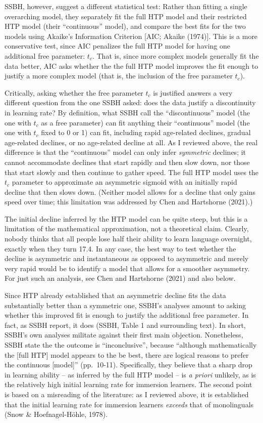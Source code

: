 \documentclass[
  english,
  doc,floatsintext]{apa6}
\begin{document}
SSBH, however, suggest a different statistical test: Rather than fitting a single overarching model, they separately fit the full HTP model and their restricted HTP model (their ``continuous'' model), and compare the best fits for the two models using Akaike's Information Criterion {[}AIC; Akaike (1974){]}. This is a more conservative test, since AIC penalizes the full HTP model for having one additional free parameter: \(t_c\). That is, since more complex models generally fit the data better, AIC asks whether the the full HTP model improves the fit enough to justify a more complex model (that is, the inclusion of the free parameter \(t_c\)).

Critically, asking whether the free parameter \(t_c\) is justified answers a very different question from the one SSBH asked: does the data justify a discontinuity in learning rate? By definition, what SSBH call the ``discontinuous'' model (the one with \(t_c\) as a free parameter) can fit anything their ``continuous'' model (the one with \(t_c\) fixed to 0 or 1) can fit, including rapid age-related declines, gradual age-related declines, or no age-related decline at all. As I reviewed above, the real difference is that the ``continuous'' model can only infer \emph{symmetric} declines; it cannot accommodate declines that start rapidly and then slow down, nor those that start slowly and then continue to gather speed. The full HTP model uses the \(t_c\) parameter to approximate an asymmetric sigmoid with an initially rapid decline that then slows down. (Neither model allows for a decline that only gains speed over time; this limitation was addressed by Chen and Hartshorne (2021).)

The initial decline inferred by the HTP model can be quite steep, but this is a limitation of the mathematical approximation, not a theoretical claim. Clearly, nobody thinks that all people lose half their ability to learn language overnight, exactly when they turn 17.4. In any case, the best way to test whether the decline is asymmetric and instantaneous as opposed to asymmetric and merely very rapid would be to identify a model that allows for a smoother asymmetry. For just such an analysis, see Chen and Hartshorne (2021) and also below.

Since HTP already established that an asymmetric decline fits the data substantially better than a symmetric one, SSBH's analyses amount to asking whether this improved fit is enough to justify the additional free parameter. In fact, as SSBH report, it does (SSBH, Table 1 and surrounding text). In short, SSBH's own analyses militate against their first main objection. Nonetheless, SSBH state the the outcome is ``inconclusive'', because ``although mathematically the {[}full HTP{]} model appears to the be best, there are logical reasons to prefer the continuous {[}model{]}'' (pp.~10-11). Specifically, they believe that a sharp drop in learning ability -- as inferred by the full HTP model -- is \emph{a priori} unlikely, as is the relatively high initial learning rate for immersion learners. The second point is based on a misreading of the literature: as I reviewed above, it is established that the initial learning rate for immersion learners \emph{exceeds} that of monolinguals (Snow \& Hoefnagel-Höhle, 1978).
\end{document}

